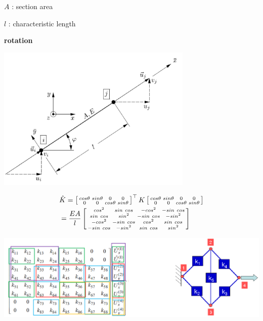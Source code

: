 \documentclass[landscape,a0paper,fontscale=0.285]{baposter} %
\begin{document}
\begin{poster}
{$A$ : section area

$l$ : characteristic length

\textbf{rotation}

\vspace{-1.4cm}
\begin{center}
\includegraphics[width=0.7\textwidth]{figures/ETHz_AFEA_FEM_tranformation.png}
\end{center}
\vspace{-0.3cm}
$$\vspace{-0.3cm}
\begin{aligned}
&\hat K = 
\left[\begin{smallmatrix}
    cos\theta & sin\theta & 0 & 0 \\
    0 & 0 & cos\theta & sin\theta
\end{smallmatrix}\right]^\top
K 
\left[\begin{smallmatrix}
    cos\theta & sin\theta & 0 & 0 \\
    0 & 0 & cos\theta & sin\theta
\end{smallmatrix}\right]\\
 &= \frac{EA}{l}\left[\begin{smallmatrix}
     cos^2 & sin~cos & -cos^2 & -sin~cos\\
     sin~cos & sin^2 & -sin~cos & -sin^2 \\
     -cos^2 & -sin~cos & cos^2 & sin~cos \\
     -sin~cos & -sin^2 & sin~cos & sin^2
 \end{smallmatrix}\right]
 \end{aligned}
$$

\includegraphics[width=\textwidth]{figures/ETHz_AFEA_FEM_stiffness.png}


}
\end{poster}
\end{document}
